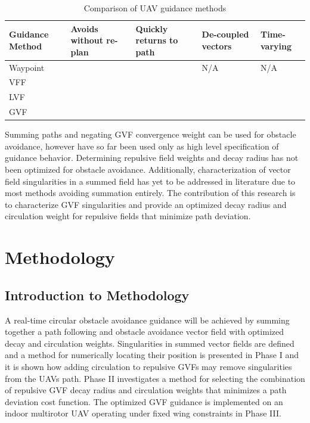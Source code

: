 \documentclass[numbered,pdftex]{ohio-etd}
\begin{document}
\begin{table}[]
	\centering
	\caption{Comparison of UAV guidance methods}
	\label{table:compareMeth}
	\begin{tabular}{|C{2.5cm}|C{2.5cm}|C{2.5cm}|C{2.5cm}|C{2.5cm}|}
		\hline
		Guidance Method & Avoids without re-plan    & Quickly returns to path   & De-coupled vectors        & Time-varying              \\ \hline
		Waypoint        &                           & \Checkmark & N/A                       & N/A                       \\ \hline
		VFF             & \Checkmark &                           &                           &                           \\ \hline
		LVF             & \Checkmark & \Checkmark &                           &                           \\ \hline
		GVF             & \Checkmark & \Checkmark & \Checkmark & \Checkmark \\ \hline
	\end{tabular}
\end{table}

 Summing paths and negating GVF convergence weight can be used for obstacle avoidance, however have so far been used only as high level specification of guidance behavior. Determining repulsive field weights and decay radius has not been optimized for obstacle avoidance. Additionally, characterization of vector field singularities in a summed field has yet to be addressed in literature due to most methods avoiding summation entirely. The contribution of this research is to characterize GVF singularities and provide an optimized decay radius and circulation weight for repulsive fields that minimize path deviation. 

\chapter{Methodology}


\section{Introduction to Methodology}
A real-time circular obstacle avoidance guidance will be achieved by summing together a path following and obstacle avoidance vector field with optimized decay and circulation weights. Singularities in summed vector fields are defined and a method for numerically locating their position is presented in Phase I and it is shown how adding circulation to repulsive GVFs may remove singularities from the UAVs path. Phase II investigates a method for selecting the combination of repulsive GVF decay radius and circulation weights that minimizes a path deviation cost function. The optimized GVF guidance is implemented on an indoor multirotor UAV operating under fixed wing constraints in Phase III.
\end{document}
